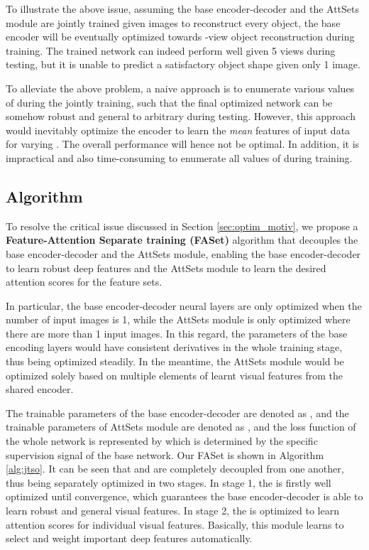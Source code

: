 \documentclass[twocolumn]{svjour3}    \pdfoutput=1
\newcommand{\nickname}{AttSets}
\newcommand{\faset}{FASet}
\newcommand{\rev}{}
\begin{document}
\rev{To illustrate the above issue, assuming the base encoder-decoder and the \nickname{} module are jointly trained given  images to reconstruct every object, the base encoder will be eventually optimized towards -view object reconstruction during training.} The trained network can indeed perform well given 5 views during testing, but it is unable to predict a satisfactory object shape given only 1 image.

To alleviate the above problem, a naive approach is to enumerate various values of  during the jointly training, such that the final optimized network can be somehow robust and general to arbitrary  during testing. However, this approach would inevitably optimize the encoder to learn the \textit{mean} features of input data for varying . The overall performance will hence not be optimal. In addition, it is impractical and also time-consuming to enumerate all values of  during training.

\vspace{-0.45cm}
\subsection{Algorithm}
To resolve the critical issue discussed in Section \ref{sec:optim_motiv}, we propose a \textbf{Feature-Attention Separate training (FASet)} algorithm that decouples the base encoder-decoder and the \nickname{} module, enabling the base encoder-decoder to learn robust deep features and the \nickname{} module to learn the desired attention scores for the feature sets.

In particular, the base encoder-decoder neural layers are only optimized when the number of input images is 1, while the \nickname{} module is only optimized where there are more than 1 input images. In this regard, the parameters of the base encoding layers would have consistent derivatives in the whole training stage, thus being optimized steadily. In the meantime, the \nickname{} module would be optimized solely based on multiple elements of learnt visual features from the shared encoder. 

The trainable parameters of the base encoder-decoder are denoted as , and the trainable parameters of \nickname{} module are denoted as , and the loss function of the whole network is represented by  which is determined by the specific supervision signal of the base network. Our \faset{} is shown in Algorithm \ref{alg:jtso}. It can be seen that  and  are completely decoupled from one another, thus being separately optimized in two stages. In stage 1, the  is firstly well optimized until convergence, which guarantees the base encoder-decoder is able to learn robust and general visual features. In stage 2, the  is optimized to learn attention scores for individual visual features. Basically, this module learns to select and weight important deep features automatically. 
\end{document}
